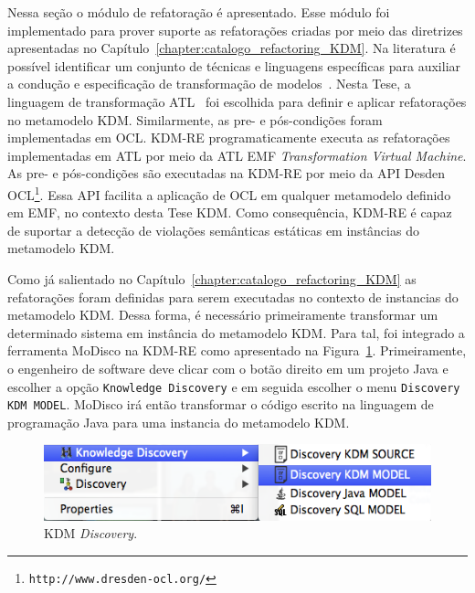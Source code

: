Nessa seção o módulo de refatoração é apresentado. Esse módulo foi implementado para prover suporte as refatorações criadas por meio das diretrizes apresentadas no Capítulo~\ref{chapter:catalogo_refactoring_KDM}. Na literatura é possível identificar um conjunto de técnicas e linguagens específicas para auxiliar a condução e especificação de transformação de modelos~\cite{Biehl_2010, Mens_2006, Allilaire_06}. Nesta Tese, a linguagem de transformação ATL~\cite{ATL_eclipse,Jouault_2008} foi escolhida para definir e aplicar refatorações no metamodelo KDM. Similarmente, as pre- e pós-condições foram implementadas em OCL. KDM-RE programaticamente executa as refatorações implementadas em ATL por meio da ATL EMF \textit{Transformation Virtual Machine}. As pre- e pós-condições são executadas na KDM-RE por meio da API Desden OCL\footnote{\texttt{http://www.dresden-ocl.org/}}. Essa API facilita a aplicação de OCL em qualquer metamodelo definido em EMF, no contexto desta Tese KDM. Como consequência, KDM-RE é capaz de suportar a detecção de violações semânticas estáticas em instâncias do metamodelo KDM.


Como já salientado no Capítulo~\ref{chapter:catalogo_refactoring_KDM} as refatorações foram definidas para serem executadas no contexto de instancias do metamodelo KDM. Dessa forma, é necessário primeiramente transformar um determinado sistema em instância do metamodelo KDM. Para tal, foi integrado a ferramenta MoDisco na KDM-RE como apresentado na Figura~\ref{fig:kdm_modisco_discovery}. Primeiramente, o engenheiro de software deve clicar com o botão direito em um projeto Java e escolher a opção \texttt{Knowledge Discovery} e em seguida escolher o menu \texttt{Discovery KDM MODEL}. MoDisco irá então transformar o código escrito na linguagem de programação Java para uma instancia do metamodelo KDM. 

\begin{figure}[h]
	\centering
	\caption{KDM \textit{Discovery}.}
	\label{fig:kdm_modisco_discovery}
	\includegraphics[scale=0.65]{images/kdm_discovery_kdm_re}
	\fautor
\end{figure}

